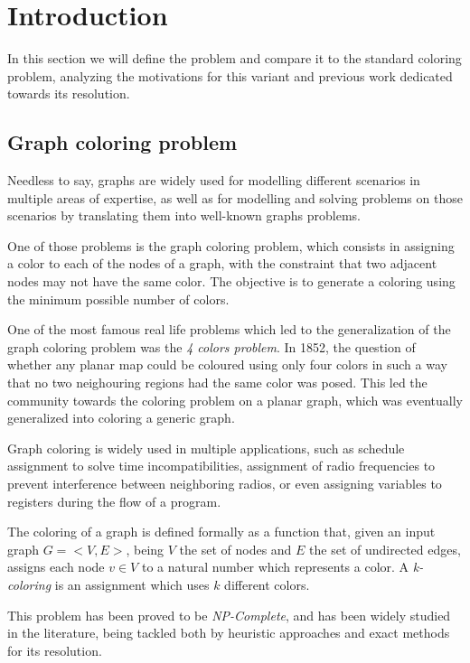 
\section{Introduction}
\label{sec:introduction}

In this section we will define the problem and compare it to the standard coloring problem, analyzing the motivations for this variant and previous work dedicated towards its resolution.

\subsection{Graph coloring problem}

Needless to say, graphs are widely used for modelling different scenarios in multiple areas of expertise, as well as for modelling and solving problems on those scenarios by translating them into well-known graphs problems. 

One of those problems is the graph coloring problem, which consists in assigning a color to each of the nodes of a graph, with the constraint that two adjacent nodes may not have the same color. The objective is to generate a coloring using the minimum possible number of colors.

One of the most famous real life problems which led to the generalization of the graph coloring problem was the \textit{4 colors problem}. In 1852, the question of whether any planar map could be coloured using only four colors in such a way that no two neighouring regions had the same color was posed. This led the community towards the coloring problem on a planar graph, which was eventually generalized into coloring a generic graph.

Graph coloring is widely used in multiple applications, such as schedule assignment to solve time incompatibilities, assignment of radio frequencies to prevent interference between neighboring radios, or even assigning variables to registers during the flow of a program.

The coloring of a graph is defined formally as a function that, given an input graph $G = <V,E>$, being $V$ the set of nodes and $E$ the set of undirected edges, assigns each node $v \in V$ to a natural number which represents a color. A \textit{k-coloring} is an assignment which uses $k$ different colors.

This problem has been proved to be \textit{NP-Complete}, and has been widely studied in the literature, being tackled both by heuristic approaches and exact methods for its resolution.


